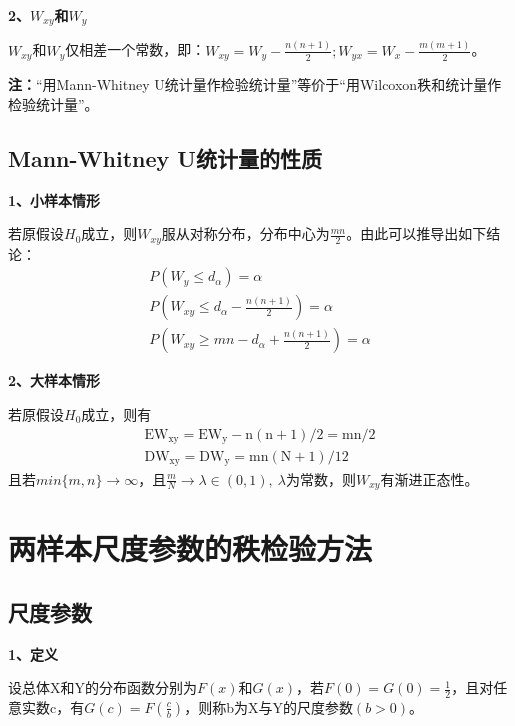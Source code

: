 \documentclass[lang=cn,10pt]{elegantbook}
\begin{document}
\textbf{2、$W_{xy}$和$W_y$}
\begin{theorem}
    $W_{xy}$和$W_{y}$仅相差一个常数，即：$W_{xy} = W_y - \frac{n(n+1)}2;W_{yx} = W_x - \frac{m(m+1)}2$。
\end{theorem}
\textbf{注：}“用Mann-Whitney U统计量作检验统计量”等价于“用Wilcoxon秩和统计量作检验统计量”。

\subsection{Mann-Whitney U统计量的性质}
\textbf{1、小样本情形}
\begin{proposition}
    若原假设$H_0$成立，则$W_{xy}$服从对称分布，分布中心为$\frac{mn}2$。由此可以推导出如下结论：
    \begin{equation*}
        \begin{gathered}
            P(W_y\leq d_{\alpha}) = \alpha \\
            P(W_{xy}\leq d_{\alpha} - \frac{n(n+1)}2)= \alpha \\
            P(W_{xy}\geq mn - d_{\alpha} + \frac{n(n+1)}2)= \alpha
        \end{gathered}
    \end{equation*}
\end{proposition}

\textbf{2、大样本情形}
\begin{proposition}
    若原假设$H_0$成立，则有
    \begin{equation}
        \begin{aligned}
            \mathrm{EW_{xy}=EW_y-n(n+1)/2=mn/2} \\
            \mathrm{DW_{xy}=DW_y=mn(N+1)/12}
        \end{aligned}
    \end{equation}
    且若$min\{m,n\}\rightarrow \infty$，且$\frac{m}N \rightarrow \lambda \in (0,1),~\lambda$为常数，则$W_{xy}$有渐进正态性。
\end{proposition}

\section{两样本尺度参数的秩检验方法}

\subsection{尺度参数}
\textbf{1、定义}
\begin{definition}
    设总体X和Y的分布函数分别为$F(x)$和$G(x)$，若$F(0) = G(0) = \frac12$，且对任意实数c，有$G(c) = F(\frac{c}b)$，则称b为X与Y的尺度参数$(b >0)$。
\end{definition}
\end{document}
